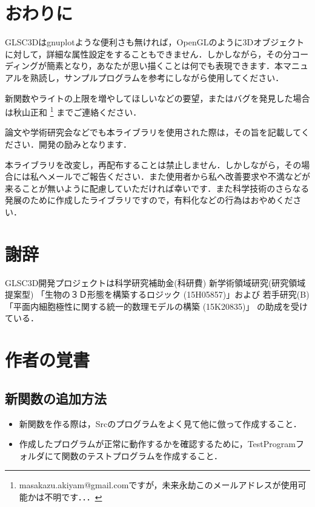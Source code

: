 \documentclass[platex,a4paper,12pt]{jsarticle}%
\begin{document}
\section{おわりに}

GLSC3Dはgnuplotような便利さも無ければ，OpenGLのように3Dオブジェクトに対して，詳細な属性設定をすることもできません．しかしながら，その分コーディングが簡素となり，あなたが思い描くことは何でも表現できます．本マニュアルを熟読し，サンプルプログラムを参考にしながら使用してください．

新関数やライトの上限を増やしてほしいなどの要望，またはバグを発見した場合は秋山正和
\footnote{masakazu.akiyam@gmail.comですが，未来永劫このメールアドレスが使用可能かは不明です．．．}
までご連絡ください．

論文や学術研究会などでも本ライブラリを使用された際は，その旨を記載してください．開発の励みとなります．

本ライブラリを改変し，再配布することは禁止しません．しかしながら，その場合には私へメールでご報告ください．また使用者から私へ改善要求や不満などが来ることが無いように配慮していただければ幸いです．また科学技術のさらなる発展のために作成したライブラリですので，有料化などの行為はおやめください．

\section{謝辞}
GLSC3D開発プロジェクトは科学研究補助金(科研費) 	
新学術領域研究(研究領域提案型) 「生物の３Ｄ形態を構築するロジック (15H05857)」および
若手研究(B)「平面内細胞極性に関する統一的数理モデルの構築 (15K20835)」
の助成を受けている．

\newpage
\section{作者の覚書}

\subsection{新関数の追加方法}
\begin{itemize}
 \item 新関数を作る際は，Srcのプログラムをよく見て他に倣って作成すること．
 \item 作成したプログラムが正常に動作するかを確認するために，TestProgramフォルダにて関数のテストプログラムを作成すること．
\end{itemize}
\end{document}

